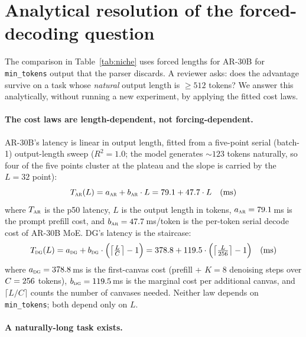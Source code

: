 \section{Analytical resolution of the forced-decoding question}
\label{app:forced}

The comparison in Table~\ref{tab:niche} uses forced lengths for AR-30B for
\texttt{min\_tokens} output that the parser discards. A reviewer asks:
does the advantage survive on a task whose \emph{natural} output length
is $\geq 512$ tokens? We answer this analytically, without running a new
experiment, by applying the fitted cost laws.

\paragraph{The cost laws are length-dependent, not forcing-dependent.}

AR-30B's latency is linear in output length, fitted from a five-point
serial (batch-1) output-length sweep ($R^2 = 1.0$; the model generates ${\sim}123$
tokens naturally, so four of the five points cluster at the plateau and
the slope is carried by the $L{=}32$ point):
\begin{equation}
T_{\textsc{ar}}(L) = a_{\textsc{ar}} + b_{\textsc{ar}} \cdot L
= 79.1 + 47.7 \cdot L \quad\text{(ms)}
\end{equation}
where $T_{\textsc{ar}}$ is the p50 latency, $L$ is the output length in
tokens, $a_{\textsc{ar}} = 79.1$\,ms is the prompt prefill cost, and
$b_{\textsc{ar}} = 47.7$\,ms/token is the per-token serial decode cost of AR-30B MoE.
DG's latency is the staircase:
\begin{equation}
T_{\textsc{dg}}(L) = a_{\textsc{dg}} + b_{\textsc{dg}} \cdot
\Bigl(\bigl\lceil \tfrac{L}{C} \bigr\rceil - 1\Bigr)
= 378.8 + 119.5 \cdot
\Bigl(\bigl\lceil \tfrac{L}{256} \bigr\rceil - 1\Bigr) \quad\text{(ms)}
\end{equation}
where $a_{\textsc{dg}} = 378.8$\,ms is the first-canvas cost (prefill +
$K{=}8$ denoising steps over $C = 256$ tokens), $b_{\textsc{dg}} =
119.5$\,ms is the marginal cost per additional canvas, and
$\lceil L/C \rceil$ counts the number of canvases needed. Neither law
depends on \texttt{min\_tokens}; both depend only on $L$.

\paragraph{A naturally-long task exists.}

